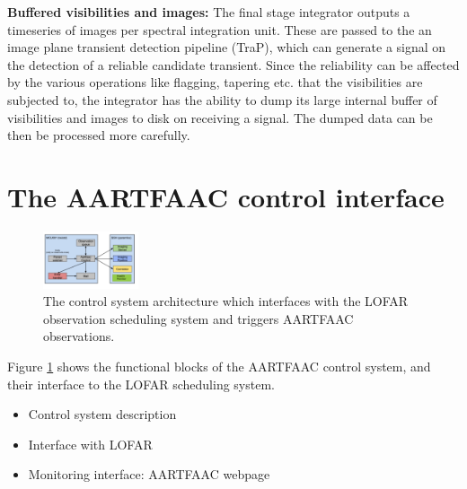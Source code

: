 \documentclass{ws-jai}
\begin{document}
\textbf {Buffered visibilities and images:} The final stage integrator outputs a
timeseries of images  per spectral integration unit. These are  passed to the an
image plane transient detection pipeline (TraP),  which can generate a signal on
the detection  of a reliable candidate  transient. Since the reliability  can be
affected  by the  various  operations  like flagging,  tapering  etc.  that  the
visibilities are subjected to, the integrator  has the ability to dump its large
internal buffer  of visibilities and images  to disk on receiving  a signal. The
dumped data can be then be processed more carefully.



\section {\label{sec:acontrol} The AARTFAAC control interface}
\begin{figure}[htbp]
\centering
\includegraphics[width=0.25\textwidth]{Figs/control_sys.png}
\caption{The  control  system  architecture  which  interfaces  with  the  LOFAR
  observation scheduling system and triggers AARTFAAC observations.}
\label{fig:afaac_ctrl_sys}
\end{figure}
Figure  \ref{fig:afaac_ctrl_sys} shows  the  functional blocks  of the  AARTFAAC
control system, and their interface to the LOFAR scheduling system.
\begin {itemize}
 \item {Control system description}
 \item {Interface with LOFAR}
 \item {Monitoring interface: AARTFAAC webpage}
\end {itemize}
\end{document}
